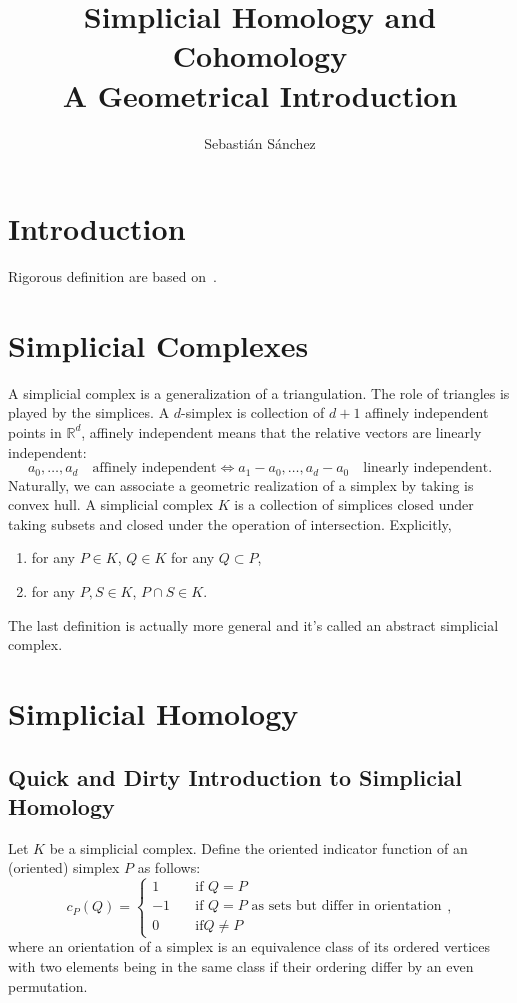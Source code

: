 \documentclass{article}
\title{Simplicial Homology and Cohomology\\ A Geometrical Introduction}
\author{Sebastián Sánchez}
\newcommand{\R}{\mathbb R}
\begin{document}
\maketitle

\section{Introduction}

Rigorous definition are based on~\cite{munkres}.

\section{Simplicial Complexes}

A simplicial complex is a generalization of a triangulation. The role of triangles is
played by the simplices. A \(d\)-simplex is collection of \(d+1\) affinely independent points
in \(\R^{d}\), affinely independent means that the relative vectors are linearly independent:
\begin{displaymath}
  a_0, \dots, a_d \quad\textrm{affinely independent}
  \iff
  a_1-a_0, \dots, a_d-a_0 \quad\textrm{linearly independent}.
\end{displaymath}
Naturally, we can associate a geometric realization of a simplex by taking is convex hull.
A simplicial complex \(K\) is a collection of simplices closed under taking subsets and 
closed under the operation of intersection. Explicitly,
\begin{enumerate}
  \item for any \(P\in K\), \(Q\in K\) for any \(Q\subset P\),
  \item for any \(P, S\in K\), \(P\cap S \in K\).
\end{enumerate}

The last definition is actually more general and it's called an abstract simplicial
complex.

\section{Simplicial Homology}

\subsection{Quick and Dirty Introduction to Simplicial Homology}

Let \(K\) be a simplicial complex. Define the oriented indicator function of an
(oriented) simplex \(P\) as follows:
\begin{displaymath}
  c_P(Q) =
  \left\{
  \begin{aligned}
    1 &\quad \textrm{if } Q=P\\
    -1 &\quad \textrm{if } Q=P\text{ as sets but differ in orientation}\\
    0 &\quad \textrm{if} Q\ne P
  \end{aligned}
  \right.,
\end{displaymath}
where an orientation of a simplex is an equivalence class of its ordered vertices
with two elements being in the same class if their ordering differ by an even
permutation.
\end{document}
